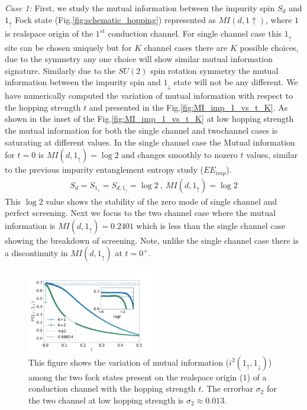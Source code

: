\documentclass[reprint,prb,superscriptaddress]{revtex4-2}
\begin{document}
\par \textit{Case 1:} First, we study the mutual information between the impurity spin $S_d$ and $1_\uparrow$ Fock state (Fig.\ref{fig:schematic_hopping}) represented as $MI(d,1\uparrow)$, where $1$ is realspace origin of the $1^{st}$ conduction channel. For single channel case this $1_{\uparrow}$ site can be chosen uniquely but for $K$ channel cases there are $K$ possible choices, due to the symmetry any one choice will show similar mutual information signature. Similarly due to the $SU(2)$ spin rotation symmetry the mutual information between the impurity spin and $1_{\downarrow}$ state will not be any different. We have numerically computed the variation of mutual information with respect to the hopping strength $t$ and presented in the Fig.\ref{fig:MI_imp_1_vs_t_K}.  As shown in the inset of the Fig.\ref{fig:MI_imp_1_vs_t_K} at low hopping strength the mutual information for both the single channel and twochannel cases is saturating at different values. In the single channel case the Mutual information for $t=0$ is $MI(d,1_{\uparrow})=\log 2$ and changes smoothly to nozero $t$ values, similar to the previous impurity entanglement entropy study ($EE_{imp}$).
\begin{eqnarray}
S_{d}=S_{1_{\uparrow}}=S_{d,1_{\uparrow}}=\log 2~,~MI(d,1_{\uparrow})=\log 2
\end{eqnarray}
This $\log 2$ value shows the stability of the zero mode of single channel and perfect screening. Next we focus to the two channel case where the mutual information is $MI(d,1_{\uparrow})=0.2401$ which is less than the single channel case showing the breakdown of screening. Note, unlike the single channel case there is a discontinuity in $MI(d,1_{\uparrow})$ at $t=0^+$.
\begin{figure}[!htpb]
\includegraphics[width=0.49\textwidth]{plt/A_I2_ch12_['1_up','1_down']}
\caption{This figure shows the variation of mutual information ($i^2(1_{\uparrow},1_{\downarrow})$) among the two fock states present on the realspace origin ($1$) of a conduction channel with the hopping strength $t$. The errorbar $\sigma_2$ for the two channel at low hopping strength is $\sigma_2\approx 0.013$.}
\label{fig:MI_1_2_vs_t_K}
\end{figure}
\end{document}
